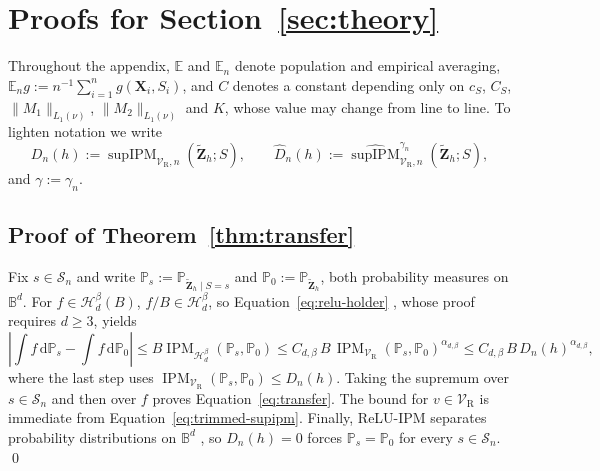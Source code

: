 \section{Proofs for Section~\ref{sec:theory}}
\label{app:proofs}

Throughout the appendix, $\mathbb{E}$ and $\mathbb{E}_n$ denote population and empirical averaging, $\mathbb{E}_n g:=n^{-1}\sum_{i=1}^n g(\mathbf{X}_i,S_i)$, and $C$ denotes a constant depending only on $c_S$, $C_S$, $\lVert M_1\rVert_{L_1(\nu)}$, $\lVert M_2\rVert_{L_1(\nu)}$ and $K$, whose value may change from line to line.  To lighten notation we write
\[
  D_n(h):=\operatorname{supIPM}_{\mathcal{V}_{\mathrm{R}},n}(\widetilde{\mathbf{Z}}_h;S),
  \qquad
  \widehat{D}_n(h):=\widehat{\operatorname{supIPM}}^{\gamma_n}_{\mathcal{V}_{\mathrm{R}},n}(\widetilde{\mathbf{Z}}_h;S),
\]
and $\gamma:=\gamma_n$.

\subsection{Proof of Theorem~\ref{thm:transfer}}

Fix $s\in\mathcal{S}_n$ and write $\mathbb{P}_s:=\mathbb{P}_{\widetilde{\mathbf{Z}}_h\mid S=s}$ and $\mathbb{P}_0:=\mathbb{P}_{\widetilde{\mathbf{Z}}_h}$, both probability measures on $\mathbb{B}^d$.  For $f\in\mathcal{H}^{\beta}_d(B)$, $f/B\in\mathcal{H}^{\beta}_d$, so Equation~\ref{eq:relu-holder} \citep[Theorem~2]{park2025relu}, whose proof requires $d\ge3$, yields
\[
  \left|\int f\,\mathrm{d}\mathbb{P}_s-\int f\,\mathrm{d}\mathbb{P}_0\right|
  \le B\operatorname{IPM}_{\mathcal{H}^{\beta}_d}(\mathbb{P}_s,\mathbb{P}_0)
  \le C_{d,\beta}\,B\,
     \operatorname{IPM}_{\mathcal{V}_{\mathrm{R}}}(\mathbb{P}_s,\mathbb{P}_0)^{\alpha_{d,\beta}}
  \le C_{d,\beta}\,B\,D_n(h)^{\alpha_{d,\beta}},
\]
where the last step uses $\operatorname{IPM}_{\mathcal{V}_{\mathrm{R}}}(\mathbb{P}_s,\mathbb{P}_0)\le D_n(h)$.  Taking the supremum over $s\in\mathcal{S}_n$ and then over $f$ proves Equation~\ref{eq:transfer}.  The bound for $v\in\mathcal{V}_{\mathrm{R}}$ is immediate from Equation~\ref{eq:trimmed-supipm}.  Finally, ReLU-IPM separates probability distributions on $\mathbb{B}^d$ \citep[Proposition~1]{park2025relu}, so $D_n(h)=0$ forces $\mathbb{P}_s=\mathbb{P}_0$ for every $s\in\mathcal{S}_n$.
\qed

